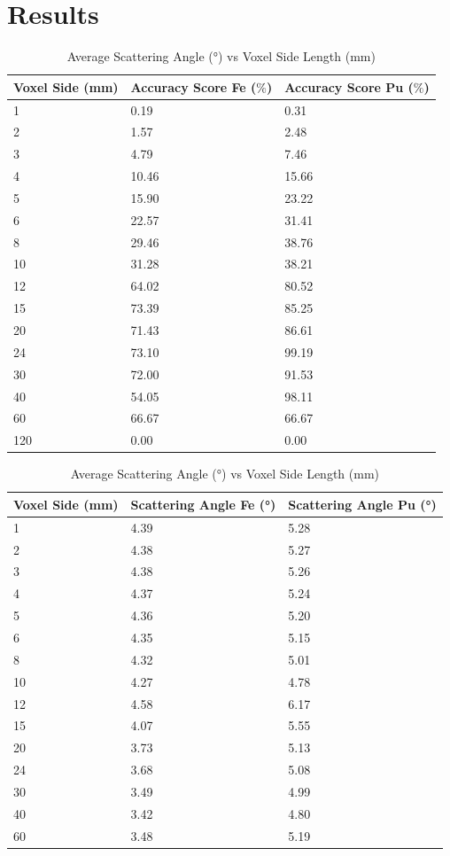 \documentclass[10pt,a4paper]{article}
\begin{document}
\section{Results}
\noindent
\begin{table}[!ht]
    \centering
    \begin{tabular}{|l|l|l|}
    \hline
        Voxel Side (mm) & Accuracy Score Fe (\(\%\)) & Accuracy Score Pu (\(\%\)) \\ \hline
        1 & 0.19 & 0.31 \\ \hline
        2 & 1.57 & 2.48 \\ \hline
        3 & 4.79 & 7.46 \\ \hline
        4 & 10.46 & 15.66 \\ \hline
        5 & 15.90 & 23.22 \\ \hline
        6 & 22.57 & 31.41 \\ \hline
        8 & 29.46 & 38.76 \\ \hline
        10 & 31.28 & 38.21 \\ \hline
        12 & 64.02 & 80.52 \\ \hline
        15 & 73.39 & 85.25 \\ \hline
        20 & 71.43 & 86.61 \\ \hline
        24 & 73.10 & 99.19 \\ \hline
        30 & 72.00 & 91.53 \\ \hline
        40 & 54.05 & 98.11 \\ \hline
        60 & 66.67 & 66.67 \\ \hline
        120 & 0.00 & 0.00\\ \hline    
    \end{tabular}
    \centering
    \caption{Accuracy Score (\(\%\)) vs Voxel Side Length (mm)}
    \begin{tabular}{|l|l|l|}
    \hline
        Voxel Side (mm) & Scattering Angle Fe (°) & Scattering Angle Pu (°) \\ \hline
        1 & 4.39 & 5.28 \\ \hline
        2 & 4.38 & 5.27 \\ \hline
        3 & 4.38 & 5.26 \\ \hline
        4 & 4.37 & 5.24 \\ \hline
        5 & 4.36 & 5.20 \\ \hline
        6 & 4.35 & 5.15 \\ \hline
        8 & 4.32 & 5.01 \\ \hline
        10 & 4.27 & 4.78 \\ \hline
        12 & 4.58 & 6.17 \\ \hline
        15 & 4.07 & 5.55 \\ \hline
        20 & 3.73 & 5.13 \\ \hline
        24 & 3.68 & 5.08 \\ \hline
        30 & 3.49 & 4.99 \\ \hline
        40 & 3.42 & 4.80 \\ \hline
        60 & 3.48 & 5.19 \\ \hline
    \end{tabular}
    \caption{Average Scattering Angle (°) vs Voxel Side Length (mm)}
\end{table}
\end{document}

